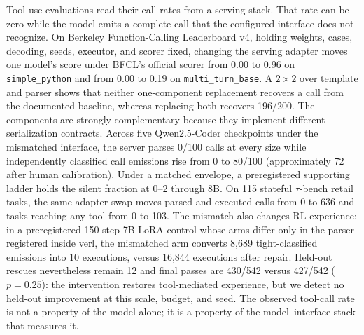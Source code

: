 Tool-use evaluations read their call rates from a serving stack. That rate can be zero while the
model emits a complete call that the configured interface does not recognize. On Berkeley
Function-Calling Leaderboard v4, holding weights, cases, decoding, seeds, executor, and scorer
fixed, changing the serving adapter moves one model's score under BFCL's official scorer from 0.00 to 0.96 on
\texttt{simple\_python} and from 0.00 to 0.19 on \texttt{multi\_turn\_base}. A $2\times2$ over
template and parser shows that neither one-component replacement recovers a call from the
documented baseline, whereas replacing both recovers 196/200. The components are strongly
complementary because they implement different serialization contracts. Across five
Qwen2.5-Coder checkpoints under the mismatched interface, the server parses 0/100 calls at every
size while independently classified call emissions rise from 0 to 80/100 (approximately 72 after
human calibration). Under a matched envelope, a preregistered supporting ladder holds the
silent fraction at 0--2 through 8B. On 115 stateful $\tau$-bench retail tasks, the same adapter swap moves
parsed and executed calls from 0 to 636 and tasks reaching any tool from 0 to 103. The mismatch
also changes RL experience: in a preregistered 150-step 7B LoRA control whose arms differ only in
the parser registered inside verl, the mismatched arm converts 8,689 tight-classified emissions
into 10 executions, versus 16,844 executions after repair. Held-out rescues nevertheless remain
12 and final passes are 430/542 versus 427/542 ($p=0.25$): the intervention restores tool-mediated
experience, but we detect no held-out improvement at this scale, budget, and seed. The observed tool-call rate
is not a property of the model alone; it is a property of the model--interface stack that measures it.

